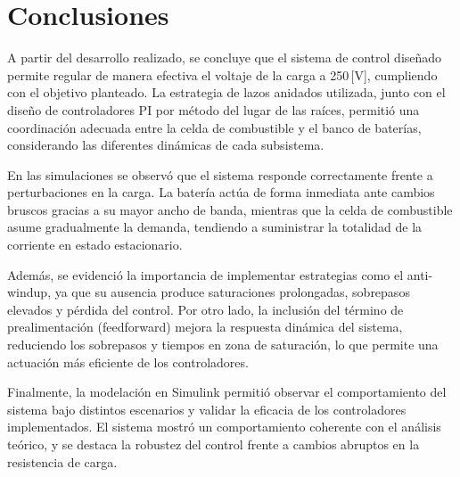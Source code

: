 \section{Conclusiones}

A partir del desarrollo realizado, se concluye que el sistema de control diseñado permite regular de manera efectiva el 
voltaje de la carga a 250 [V], cumpliendo con el objetivo planteado. La estrategia de lazos anidados 
utilizada, junto con el diseño de controladores PI por método del lugar de las raíces, permitió una coordinación 
adecuada entre la celda de combustible y el banco de baterías, considerando las diferentes dinámicas de cada subsistema.

En las simulaciones se observó que el sistema responde correctamente frente a perturbaciones en la carga. La batería actúa 
de forma inmediata ante cambios bruscos gracias a su mayor ancho de banda, mientras que la celda de combustible 
asume gradualmente la demanda, tendiendo a suministrar la totalidad de la corriente en estado estacionario.

Además, se evidenció la importancia de implementar estrategias como el anti-windup, ya que su ausencia produce 
saturaciones prolongadas, sobrepasos elevados y pérdida del control. Por otro lado, la inclusión del término de prealimentación 
(feedforward) mejora la respuesta dinámica del sistema, reduciendo los sobrepasos y tiempos en zona de saturación, 
lo que permite una actuación más eficiente de los controladores.

Finalmente, la modelación en Simulink permitió observar el comportamiento del sistema bajo distintos escenarios y validar la eficacia de 
los controladores implementados. El sistema mostró un comportamiento coherente con el análisis teórico, y se destaca la robustez 
del control frente a cambios abruptos en la resistencia de carga.

\newpage
